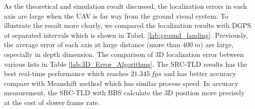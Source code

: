 \documentclass[journal,article,submit,moreauthors,pdftex,10pt,a4paper]{mdpi}
\begin{document}
As the theoretical and simulation result discussed, the localization errors in each axis are large when the UAV is far way from the ground visual system. To illustrate the result more clearly, we compared the localization results with DGPS at separated intervals which is shown in Tabel. \ref{lab:ground_landing}. Previously, the average error of each axis at large distance (more than $400\ m$) are large, especially in depth dimension. The comparison of 3D localization error between various lists in Table  \ref{lab:3D_Error_Algorithms}. The SRC-TLD results has the best real-time performance which reaches $21.345\ fps$ and has better accuracy compare with Meanshift method which has similar process speed. In accuracy measurement, the SRC-TLD with BBS calculate the 3D position more precisely at the cost of slower frame rate.
\end{document}

